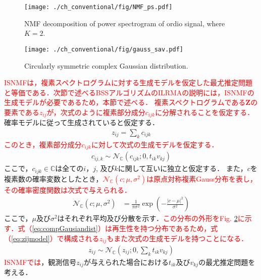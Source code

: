\begin{figure}[!t]
\centering
\texttt{[image: ./ch\_conventional/fig/NMF\_ps.pdf]}
\caption{NMF decomposition of power spectrogram of ordio signal, where $K=2$.}
\label{fig:nmf_ps}
\end{figure}

\begin{figure}[!b]
\centering
\texttt{[image: ./ch\_conventional/fig/gauss\_sav.pdf]}
\caption{Circularly symmetric complex Gaussian distribution.}
\label{fig:gauss}
\end{figure}

\textcolor{red}{ISNMFは，複素スペクトログラムに対する生成モデルを仮定した最尤推定問題と等価である．次節で述べるBSSアルゴリズムのILRMAの説明には，ISNMFの生成モデルが必要であるため，本節で述べる．}
\textcolor{red}{複素スペクトログラムである$\bm{Z}$の要素である$z_{ij}$が，次式のように複素部分成分$c_{ijk}$に分解されることを仮定する．}確率モデルに従って生成されていると仮定する．
\begin{align}
    z_{ij} = \sum_k c_{ijk}　\label{eq:zijmodel}
\end{align}
\textcolor{red}{このとき，複素部分成分$c_{ijk}$に対して次式の生成モデルを仮定する．}
\begin{align}
    c_{ij,k} \sim \mathcal{N}_{\mathbb{C}} (c_{ijk}; 0, t_{ik}v_{kj})
\end{align}
ここで，$c_{ijk}\in \mathbb{C}$は全ての$i$，$j$, 及び$k$に関して互いに独立と仮定する．
また，$c$を複素数の確率変数としたとき，\textcolor{red}{$\mathcal{N}_{\mathbb{C}} (c; \mu, \sigma^2)$は原点対称複素Gauss分布を表し，その確率密度関数は次式で与えられる．}
\begin{align}
    \mathcal{N}_{\mathbb{C}} (c; \mu, \sigma^2) &= \frac{1}{\pi \sigma^2} \exp \left( -\frac{|c-\mu|^2}{\sigma^2} \right) \label{eq:compGausiandist}
\end{align}
ここで，$\mu$及び$\sigma^2$はそれぞれ平均及び分散を示す．\textcolor{red}{この分布の外形をFig. \ref{fig:gauss}に示す．式（\ref{eq:compGausiandist}）は再生性を持つ分布であるため，式（\ref{eq:zijmodel}）で構成される$z_{ij}$もまた次式の生成モデルを持つことになる．}
\begin{align}
    z_{ij} \sim \mathcal{N}_{\mathbb{C}}\left( z_{ij}; 0, \sum_k t_{ik} v_{kj} \right) \label{eq:nmfgen}
\end{align}
\textcolor{red}{ISNMFでは}，観測信号$z_{ij}$が与えられた場合における$t_{ik}$及び$v_{kj}$の最尤推定問題を考える．
